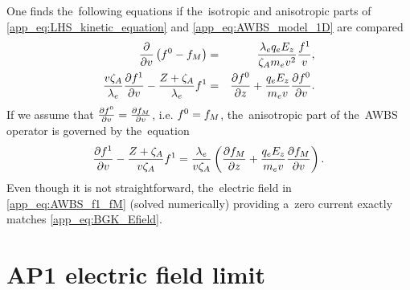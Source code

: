 One finds the~following equations if the~isotropic and anisotropic parts of 
\eqref{app_eq:LHS_kinetic_equation} and \eqref{app_eq:AWBS_model_1D} are 
compared 
\begin{eqnarray}
  \frac{\partial{}}{\partial{v}}\left( f^0 -f_M\right) &=& 
  \frac{\lambda_eq_eE_z}{\zeta_Am_ev^2}\frac{f^1}{v} ,
  \label{app_eq:AWBS_f0} \\
  \frac{v\zeta_A}{\lambda_e} \frac{\partial{f^1}}{\partial{v}} 
  - \frac{Z+\zeta_A}{\lambda_e}f^1 &=&
  \frac{\partial{f^0}}{\partial{z}} + \frac{q_eE_z}{m_ev}\frac{\partial{f^0}}{\partial{v}} .
  \label{app_eq:AWBS_f1} 
\end{eqnarray}
If we assume that $\frac{\partial{f^0}}{\partial{v}} = \frac{\partial{f_M}}{\partial{v}}$, i.e. $f^0 = f_M$,
the~anisotropic part of the~AWBS operator is governed by the~equation
\begin{equation}
  \frac{\partial{f^1}}{\partial{v}} 
  - \frac{Z+\zeta_A}{v\zeta_A}f^1 =
  \frac{\lambda_e}{v\zeta_A} 
  \left(\frac{\partial{f_M}}{\partial{z}} + \frac{q_eE_z}{m_ev}\frac{\partial{f_M}}{\partial{v}}\right) .
  \label{app_eq:AWBS_f1_fM}
\end{equation}
Even though it is not straightforward, the~electric field in 
\eqref{app_eq:AWBS_f1_fM} (solved numerically) providing a~zero current 
exactly matches \eqref{app_eq:BGK_Efield}. 



\section{AP1 electric field limit}
\label{app:AP1limit}

